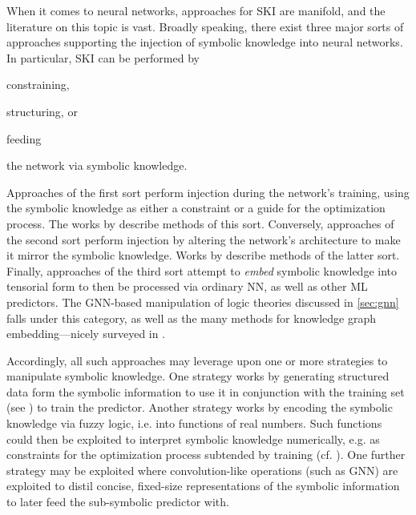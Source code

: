 \documentclass[12pt,a4paper,openright,twoside]{book}
\begin{document}
When it comes to neural networks, approaches for SKI are manifold, and the literature on this topic is vast.
%
Broadly speaking, there exist three major sorts of approaches supporting the injection of symbolic knowledge into neural networks.
%
In particular, SKI can be performed by
%
\begin{inlinelist}
    \item constraining,
    \item structuring, or
    \item feeding
\end{inlinelist}
%
the network via symbolic knowledge.

Approaches of the first sort perform injection during the network's training, using the symbolic knowledge as either a constraint or a guide for the optimization process.
%
The works by \cite{DiligentiGS17,MarraGDG2019} describe methods of this sort.
%
Conversely, approaches of the second sort perform injection by altering the network's architecture to make it mirror the symbolic knowledge.
%
Works by \cite{Ballard86,TrespHA92} describe methods of the latter sort.
%
Finally, approaches of the third sort attempt to \emph{embed} symbolic knowledge into tensorial form to then be processed via ordinary NN, as well as other ML predictors.
%
The GNN-based manipulation of logic theories discussed in \cref{sec:gnn} falls under this category, as well as the many methods for knowledge graph embedding---nicely surveyed in \cite{WangMWG17}.

Accordingly, all such approaches may leverage upon one or more strategies to manipulate symbolic knowledge.
%
One strategy works by generating structured data form the symbolic information to use it in conjunction with the training set (see \cite{vonRudenMGBS2019,ZhouYHZXZ18}) to train the predictor.
%
Another strategy works by encoding the symbolic knowledge via fuzzy logic, i.e. into functions of real numbers.
%
Such functions could then be exploited to interpret symbolic knowledge numerically, e.g. as constraints for the optimization process subtended by training (cf. \cite{DiligentiRG17,DiligentiGS17,MarraGDG2019}).
%
One further strategy may be exploited where convolution-like operations (such as GNN) are exploited to distil concise, fixed-size representations of the symbolic information to later feed the sub-symbolic predictor with.
\end{document}
